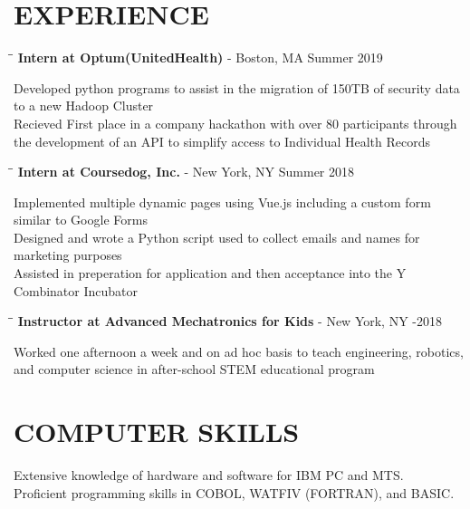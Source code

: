 \documentclass{res}
\begin{document}
\begin{resume}
\section{EXPERIENCE}
   \vspace{-0.1in}	
   \begin{tabbing}
   \hspace{2.3in}\= \hspace{3.8in}\= \kill
    {\bf Intern at Optum(UnitedHealth)} - Boston, MA   \>  \>Summer 2019
   \end{tabbing}\vspace{-20pt}  
    Developed python programs to assist in the migration of 150TB of security data to a new Hadoop Cluster\\
    Recieved First place in a company hackathon with over 80 participants through the development of an API to simplify access to 		Individual Health Records
    \vspace{-15pt} 
   \begin{tabbing}
   \hspace{2.3in}\= \hspace{3.8in}\= \kill
    {\bf Intern at Coursedog, Inc.} - New York, NY   \>  \>Summer 2018
   \end{tabbing}\vspace{-20pt} 
    Implemented multiple dynamic pages using Vue.js including a custom form similar to Google Forms\\
    Designed and wrote a Python script used to collect emails and names for marketing purposes\\          
    Assisted in preperation for application and then acceptance into the Y Combinator Incubator
   \vspace{-15pt} 
   \begin{tabbing}
   \hspace{2.3in}\= \hspace{4in}\= \kill      
   {\bf Instructor at Advanced Mechatronics for Kids} - New York, NY   \>  -2018
   \end{tabbing}\vspace{-20pt}
    Worked one afternoon a week and on ad hoc basis to teach engineering, robotics, and computer
	science in after-school STEM educational program          


\section{COMPUTER SKILLS}          
    Extensive knowledge of hardware and software for IBM PC and          
    MTS. \\         
    Proficient programming skills in COBOL, WATFIV (FORTRAN), and          
    BASIC.          
 

\end{resume}
\end{document}
